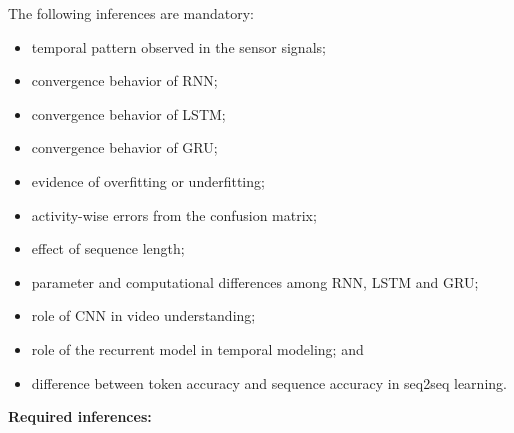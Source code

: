 \documentclass[10pt]{article}
\begin{document}
The following inferences are mandatory:

\begin{itemize}
\item temporal pattern observed in the sensor signals;
\item convergence behavior of RNN;
\item convergence behavior of LSTM;
\item convergence behavior of GRU;
\item evidence of overfitting or underfitting;
\item activity-wise errors from the confusion matrix;
\item effect of sequence length;
\item parameter and computational differences among RNN, LSTM and GRU;
\item role of CNN in video understanding;
\item role of the recurrent model in temporal modeling; and
\item difference between token accuracy and sequence accuracy in seq2seq learning.
\end{itemize}

\textbf{Required inferences:}
\end{document}

